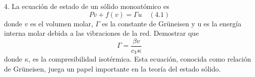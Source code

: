 4. La ecuación de estado de un sólido monoatómico es
$$
P v+f(v)=\Gamma u \quad (4.1)
$$
donde $v$ es el volumen molar, $\Gamma$ es la constante de Grüneisen y u es la energía interna molar debida a las vibraciones de la red. Demostrar que
$$
\Gamma=\frac{\beta v}{c_V \kappa}
$$
donde $\kappa$, es la compresibilidad isotérmica. Esta ecuación, conocida como relación de Grüneisen, juega un papel importante en la teoría del estado sólido.